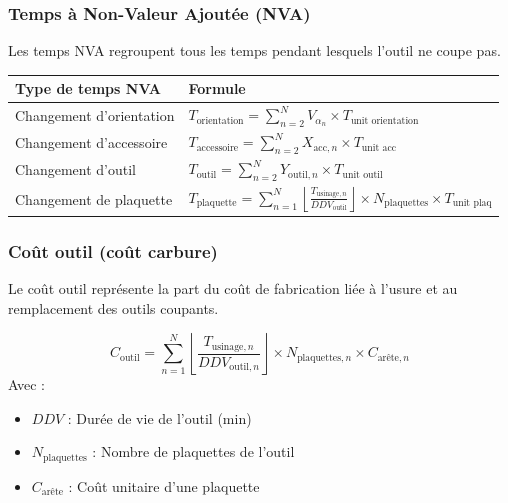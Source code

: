 \documentclass{article}
\begin{document}
\begin{table}[h]
\subsubsection{Temps à Non-Valeur Ajoutée (NVA)}

Les temps NVA regroupent tous les temps pendant lesquels l'outil ne coupe pas.

\begin{table}[h]
\centering
\begin{tabular}{|p{}|p{}|}
\hline
\textbf{Type de temps NVA} & \textbf{Formule} \\
\hline
Changement d'orientation & $\displaystyle T_{\text{orientation}} = \sum_{n=2}^{N} V_{\alpha_n} \times T_{\text{unit orientation}}$ \\
Changement d'accessoire & $\displaystyle T_{\text{accessoire}} = \sum_{n=2}^{N} X_{\text{acc},n} \times T_{\text{unit acc}}$ \\
Changement d'outil & $\displaystyle T_{\text{outil}} = \sum_{n=2}^{N} Y_{\text{outil},n} \times T_{\text{unit outil}}$ \\
Changement de plaquette & $\displaystyle T_{\text{plaquette}} = \sum_{n=1}^{N} \left\lfloor \frac{T_{\text{usinage},n}}{DDV_{\text{outil}}} \right\rfloor \times N_{\text{plaquettes}} \times T_{\text{unit plaq}}$ \\
\hline
\end{tabular}
\end{table}

\subsubsection{Coût outil (coût carbure)}

Le coût outil représente la part du coût de fabrication liée à l'usure et au remplacement des outils coupants.

\begin{tcolorbox}[colback=grisclair, colframe=gray!70!black, title=Calcul du coût outil]
\[
C_{\text{outil}} = \sum_{n=1}^{N} \left\lfloor \frac{T_{\text{usinage},n}}{DDV_{\text{outil},n}} \right\rfloor \times N_{\text{plaquettes},n} \times C_{\text{arête},n}
\]
Avec :
\begin{itemize}
    \item $DDV$ : Durée de vie de l'outil (min)
    \item $N_{\text{plaquettes}}$ : Nombre de plaquettes de l'outil
    \item $C_{\text{arête}}$ : Coût unitaire d'une plaquette
\end{itemize}
\end{tcolorbox}


\end{table}
\end{document}
